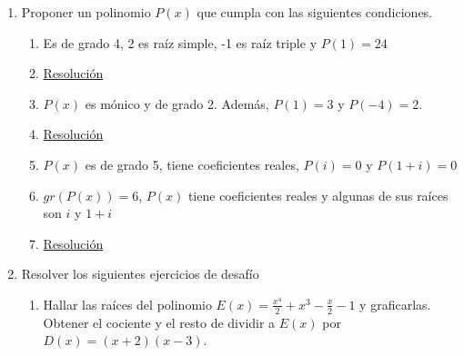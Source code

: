 \documentclass[a4paper]{article}
\newcommand{\answer}{\item[**]}
\newcommand{\exercise}{\item}
\newcommand{\df}[2]{\displaystyle\frac{#1}{#2}}
\begin{document}
\begin{enumerate}
\begin{multicols}{2}
\begin{enumerate} [label=(\alph*)]
		\item $x^6-x^4-20x^2$
		\answer Sacamos factor común y obtenemos el polinomio $x^2(x^4-x^2-20)$. Para buscar las raíces restantes realizamos la sustitución $t^2$ y el polinomio resultante es $t(t^2-t-20)$. Con la resolvente obtenemos los valores de $t=5$, del que obtenemos $x=\pm \sqrt{5}$, y $t=-4$, del que obtenemos $x=\pm2i$. Finalmenta la factorización compleja queda como: $x^2(x-\sqrt{5})(x+\sqrt{5})(x-2i)(x+2i)$. Y la factorización real queda como $x^2(x-\sqrt{5})(x+\sqrt{5})(x^+4)$.
		
		\item $x^7-x$
		\answer \href{https://youtu.be/EQIEmdkGOZE}{Resolución}

		\item $x^6+3x^3-4$
		\answer \href{https://youtu.be/BCo0pxE288w}{Resolución}

	\end{enumerate}
	\end{multicols}

	\exercise Proponer un polinomio $P(x)$ que cumpla con las siguientes condiciones.

	\begin{multicols}{2}
	\begin{enumerate} [label=(\alph*)]
		
		\item Es de grado 4, 2 es raíz simple, -1 es raíz triple y $P(1)=24$
		\answer \href{https://youtu.be/_XVYatmUKBg}{Resolución}

		\item $P(x)$ es mónico y de grado 2. Además, $P(1)=3$ y $P(-4)=2$.
		\answer \href{https://youtu.be/LDpq_f-baPc}{Resolución}

		\item $P(x)$ es de grado 5, tiene coeficientes reales, $P(i)=0$ y $P(1+i)=0$

		\item $gr\left(P(x)\right)=6$, $P(x)$ tiene coeficientes reales y algunas de sus raíces son $i$ y $1+i$
		\answer \href{https://youtu.be/LDpq_f-baPc}{Resolución}


	\end{enumerate}
	\end{multicols}

	\exercise Resolver los siguientes ejercicios de desafío
	\begin{enumerate} [label=(\alph*)]
		
		\item Hallar las raíces del polinomio $E(x)=\df{x^4}{2}+x^3-\df{x}{2}-1$ y graficarlas. Obtener el cociente y el resto de dividir a $E(x)$ por $D(x)=(x+2)(x-3)$.


\end{enumerate}
\end{enumerate}
\end{document}
